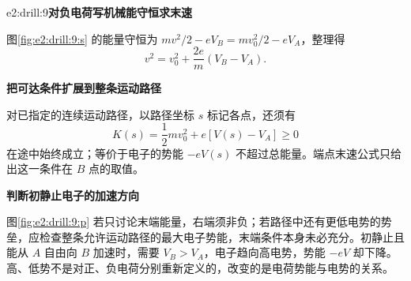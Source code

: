 \begin{drillsolution}{e2:drill:9}\textbf{对负电荷写机械能守恒求末速}\par\nobreak
图\ref{fig:e2:drill:9:s} 的能量守恒为 $mv^2/2-eV_B=mv_0^2/2-eV_A$，整理得
\[
 v^2=v_0^2+\frac{2e}{m}(V_B-V_A).
\]



\par\medskip{}\noindent\textbf{把可达条件扩展到整条运动路径}\par\nobreak
对已指定的连续运动路径，以路径坐标 $s$ 标记各点，还须有
\[
K(s)=\frac12mv_0^2+e[V(s)-V_A]\ge0
\]
在途中始终成立；等价于电子的势能 $-eV(s)$ 不超过总能量。端点末速公式只给出这一条件在 $B$ 点的取值。





\par\medskip{}\noindent\textbf{判断初静止电子的加速方向}\par\nobreak
图\ref{fig:e2:drill:9:p} 若只讨论末端能量，右端须非负；若路径中还有更低电势的势垒，应检查整条允许运动路径的最大电子势能，末端条件本身未必充分。初静止且能从 $A$ 自由向 $B$ 加速时，需要 $V_B>V_A$，电子趋向高电势，势能 $-eV$ 却下降。高、低势不是对正、负电荷分别重新定义的，改变的是电荷势能与电势的关系。\end{drillsolution}
